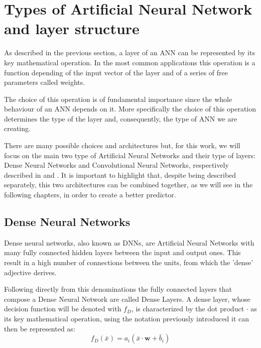 

 

\section{Types of Artificial Neural Network and layer structure}
\label{ANN_type}

As described in the previous section, a layer of an ANN can be represented by its key mathematical operation. In the most common applications this operation is a function depending of the input vector of the layer and of a series of free parameters called weights.

The choice of this operation is of fundamental importance since the whole behaviour of an ANN depends on it. More specifically the choice of this operation determines the type of the layer and, consequently, the type of ANN we are creating. 

There are many possible choices and architectures but, for this work, we will focus on the main two type of Artificial Neural Networks and their type of layers: Dense Neural Networks and Convolutional Neural Networks, respectively described in  and .
It is important to highlight that, despite being described separately, this two architectures can be combined together, as we will see in the following chapters, in order to create a better predictor.

\subsection{Dense Neural Networks}\label{dnn}

Dense neural networks, also known as DNNs, are Artificial Neural Networks with many fully connected hidden layers between the input and output ones. This result in a high number of connections between the units, from which the 'dense' adjective derives.

Following directly from this denominations the fully connected layers that compose a Dense Neural Network are called Dense Layers.
A dense layer, whose decision function will be denoted with $f_D$, is characterized by the dot product $\cdot$ as its key mathematical operation, using the notation previously introduced it can then be represented as:
\begin{equation}
    f_D (\bar{x})=a_i \left( \bar{x} \cdot \boldsymbol{w} + \bar{b}_i \right) 
    \label{eq:layer_dense}
\end{equation}

